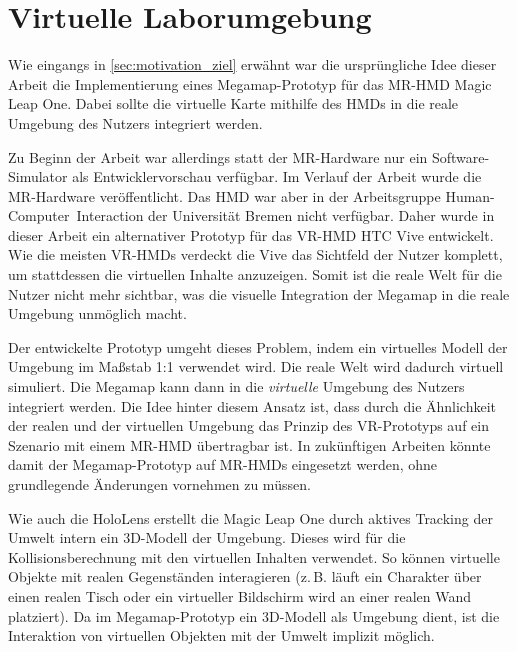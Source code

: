 \section{Virtuelle Laborumgebung}
Wie eingangs in \autoref{sec:motivation_ziel} erwähnt war die ursprüngliche Idee dieser Arbeit die Implementierung eines Megamap-Prototyp für das MR-HMD Magic Leap One.
Dabei sollte die virtuelle Karte mithilfe des HMDs in die reale Umgebung des Nutzers integriert werden.

Zu Beginn der Arbeit war allerdings statt der MR-Hardware nur ein Software-Simulator als Entwicklervorschau verfügbar.
Im Verlauf der Arbeit wurde die MR-Hardware veröffentlicht.
Das HMD war aber in der Arbeitsgruppe Human-Computer~Interaction der Universität Bremen nicht verfügbar.
Daher wurde in dieser Arbeit ein alternativer Prototyp für das VR-HMD HTC Vive entwickelt.
Wie die meisten VR-HMDs verdeckt die Vive das Sichtfeld der Nutzer komplett, um stattdessen die virtuellen Inhalte anzuzeigen.
Somit ist die reale Welt für die Nutzer nicht mehr sichtbar, was die visuelle Integration der Megamap in die reale Umgebung unmöglich macht.

Der entwickelte Prototyp umgeht dieses Problem, indem ein virtuelles Modell der Umgebung im Maßstab 1:1 verwendet wird.
Die reale Welt wird dadurch virtuell simuliert.
Die Megamap kann dann in die \textit{virtuelle} Umgebung des Nutzers integriert werden.
Die Idee hinter diesem Ansatz ist, dass durch die Ähnlichkeit der realen und der virtuellen Umgebung das Prinzip des VR-Prototyps auf ein Szenario mit einem MR-HMD übertragbar ist.
In zukünftigen Arbeiten könnte damit der Megamap-Prototyp auf MR-HMDs eingesetzt werden, ohne grundlegende Änderungen vornehmen zu müssen.

Wie auch die HoloLens erstellt die Magic Leap One durch aktives Tracking der Umwelt intern ein 3D-Modell der Umgebung.
Dieses wird für die Kollisionsberechnung mit den virtuellen Inhalten verwendet.
So können virtuelle Objekte mit realen Gegenständen interagieren (z.\,B. läuft ein Charakter über einen realen Tisch oder ein virtueller Bildschirm wird an einer realen Wand platziert).
Da im Megamap-Prototyp ein 3D-Modell als Umgebung dient, ist die Interaktion von virtuellen Objekten mit der Umwelt implizit möglich.

